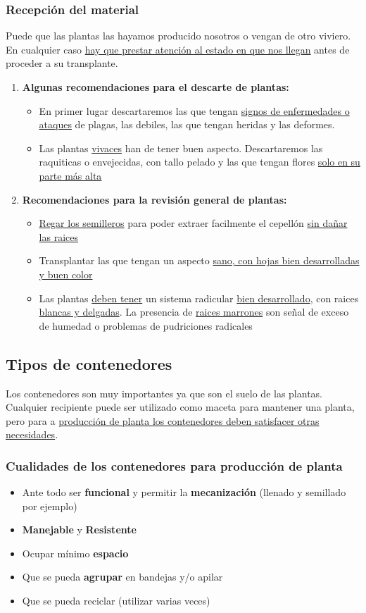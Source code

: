 \documentclass[a4paper,12pt,oneside]{article}
\begin{document}
\subsubsection{Recepción del material}
\label{sec:orgd9cc7b0}
Puede que las plantas las hayamos producido nosotros o vengan de otro
viviero. En cualquier caso \uline{hay que prestar atención al estado en que nos
llegan} antes de proceder a su transplante.
\begin{enumerate}
\item \textbf{Algunas recomendaciones para el descarte de plantas:}
\begin{itemize}
\item En primer lugar descartaremos las que tengan \uline{signos de enfermedades o ataques}
de plagas, las debiles, las que tengan heridas y las deformes.
\item Las plantas \uline{vivaces} han de tener buen aspecto. Descartaremos las raquiticas
o envejecidas, con tallo pelado y las que tengan flores \uline{solo en su parte más
alta}
\end{itemize}
\item \textbf{Recomendaciones para la revisión general de plantas:}
\begin{itemize}
\item \uline{Regar los semilleros} para poder extraer facilmente el cepellón \uline{sin dañar
las raices}
\item Transplantar las que tengan un aspecto \uline{sano, con hojas bien desarrolladas
y buen color}
\item Las plantas \uline{deben tener} un sistema radicular \uline{bien desarrollado}, con
raices \uline{blancas y delgadas}. La presencia de \uline{raices marrones} son señal de
exceso de humedad o problemas de pudriciones radicales
\end{itemize}
\end{enumerate}
\subsection{Tipos de contenedores}
\label{sec:org21c98c0}
Los contenedores son muy importantes ya que son el suelo de las
plantas. Cualquier recipiente puede ser utilizado como maceta para mantener una
planta, pero para a \uline{producción de planta los contenedores deben satisfacer
otras necesidades}.
\subsubsection{Cualidades de los contenedores para producción de planta}
\label{sec:org1ea238c}
\begin{itemize}
\item Ante todo ser \textbf{funcional} y permitir la \textbf{mecanización} (llenado y semillado
por ejemplo)
\item \textbf{Manejable} y \textbf{Resistente}
\item Ocupar mínimo \textbf{espacio}
\item Que se pueda \textbf{agrupar} en bandejas y/o apilar
\item Que se pueda reciclar (utilizar varias veces)
\end{itemize}
\end{document}
